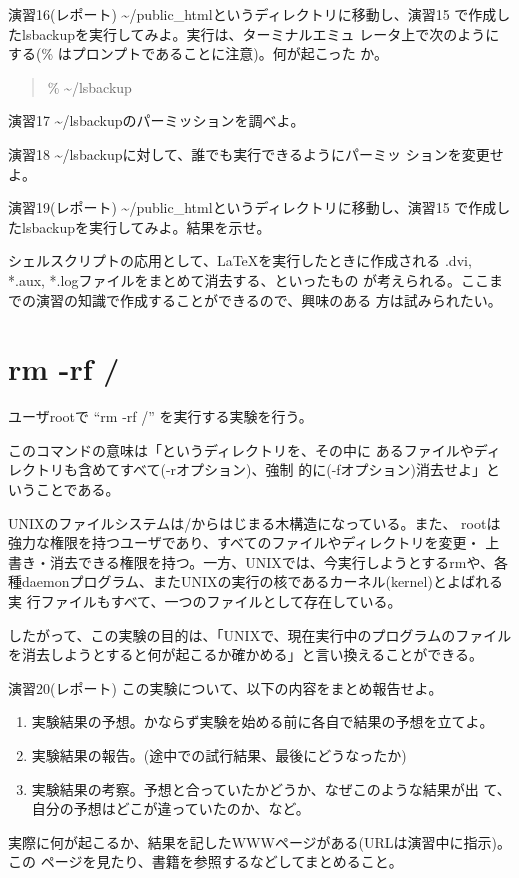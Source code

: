 \documentclass[a4j,10pt]{jarticle}
\begin{document}
\begin{itembox}{演習16(レポート)}
 {\sffamily \~{}{\slash}public\_html}というディレクトリに移動し、演習15 
 で作成した{\sffamily lsbackup}を実行してみよ。実行は、ターミナルエミュ
 レータ上で次のようにする(\% はプロンプトであることに注意)。何が起こった
 か。
 \begin{quote}
  {\sffamily \% \~{}{\slash}lsbackup}
 \end{quote}
\end{itembox}
\begin{itembox}{演習17}
 {\sffamily \~{}{\slash}lsbackup}のパーミッションを調べよ。
\end{itembox}
\begin{itembox}{演習18}
 {\sffamily \~{}{\slash}lsbackup}に対して、誰でも実行できるようにパーミッ
 ションを変更せよ。
\end{itembox}
\begin{itembox}{演習19(レポート)}
 {\sffamily \~{}{\slash}public\_html}というディレクトリに移動し、演習15 
 で作成した{\sffamily lsbackup}を実行してみよ。結果を示せ。
\end{itembox}

シェルスクリプトの応用として、\LaTeX を実行したときに作成される
{\sffamily *.dvi, *.aux, *.log}ファイルをまとめて消去する、といったもの
が考えられる。ここまでの演習の知識で作成することができるので、興味のある
方は試みられたい。

\section{rm -rf /}
ユーザrootで ``rm -rf {\slash}'' を実行する実験を行う。

このコマンドの意味は「{\sffamily {\slash}}というディレクトリを、その中に
あるファイルやディレクトリも含めてすべて({\sffamily -r}オプション)、強制
的に({\sffamily -f}オプション)消去せよ」ということである。

UNIXのファイルシステムは{\slash}からはじまる木構造になっている。また、
rootは強力な権限を持つユーザであり、すべてのファイルやディレクトリを変更・
上書き・消去できる権限を持つ。一方、UNIXでは、今実行しようとするrmや、各
種daemonプログラム、またUNIXの実行の核であるカーネル(kernel)とよばれる実
行ファイルもすべて、一つのファイルとして存在している。

したがって、この実験の目的は、「UNIXで、現在実行中のプログラムのファイル
を消去しようとすると何が起こるか確かめる」と言い換えることができる。

\begin{itembox}{演習20(レポート)}
この実験について、以下の内容をまとめ報告せよ。
\begin{enumerate}
 \item 実験結果の予想。かならず実験を始める前に各自で結果の予想を立てよ。
 \item 実験結果の報告。(途中での試行結果、最後にどうなったか)
 \item 実験結果の考察。予想と合っていたかどうか、なぜこのような結果が出
       て、自分の予想はどこが違っていたのか、など。
\end{enumerate}
実際に何が起こるか、結果を記したWWWページがある(URLは演習中に指示)。この
ページを見たり、書籍を参照するなどしてまとめること。
\end{itembox}
\end{document}

